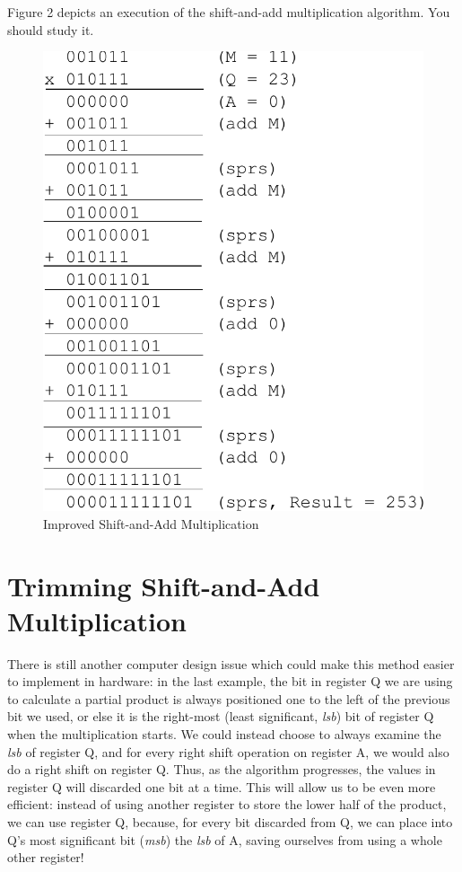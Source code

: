 \documentclass{article}
\begin{document}
Figure 2 depicts an execution of the shift-and-add multiplication algorithm.
You should study it.

\begin{figure}[h]
\centering
\includegraphics[scale=0.7]{isaam2.pdf}
\caption{Improved Shift-and-Add Multiplication}
\end{figure}

\pagebreak

\section{Trimming Shift-and-Add Multiplication}

There is still another computer design issue which could make this method easier to implement in hardware: in the last example, the bit in register Q we are using to calculate a partial product is always positioned one to the left of the previous bit we used, or else it is the right-most (least significant, \emph{lsb}) bit of register Q when the multiplication starts.
We could instead choose to always examine the \emph{lsb} of register Q, and for every right shift operation on register A, we would also do a right shift on register Q. %
Thus, as the algorithm progresses, the values in register Q will discarded one bit at a time.
This will allow us to be even more efficient: instead of using another register to store the lower half of the product, we can use register Q, because, for every bit discarded from Q, we can place into Q's most significant bit (\emph{msb}) the \emph{lsb} of A, saving ourselves from using a whole other register!
\end{document}
